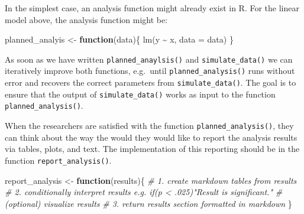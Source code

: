 \documentclass[psych,tutorial,submit,moreauthors,pdftex]{mdpi}
\newenvironment{Shaded}{\begin{snugshade}}{\end{snugshade}}
\newcommand{\AttributeTok}[1]{\textcolor[rgb]{0.77,0.63,0.00}{#1}}
\newcommand{\CommentTok}[1]{\textcolor[rgb]{0.56,0.35,0.01}{\textit{#1}}}
\newcommand{\ControlFlowTok}[1]{\textcolor[rgb]{0.13,0.29,0.53}{\textbf{#1}}}
\newcommand{\FunctionTok}[1]{\textcolor[rgb]{0.00,0.00,0.00}{#1}}
\newcommand{\NormalTok}[1]{#1}
\newcommand{\OtherTok}[1]{\textcolor[rgb]{0.56,0.35,0.01}{#1}}
\newcommand{\SpecialCharTok}[1]{\textcolor[rgb]{0.00,0.00,0.00}{#1}}
\begin{document}
In the simplest case, an analysis function might already exist in R. For
the linear model above, the analysis function might be:

\begin{Shaded}
\begin{Highlighting}[]
\NormalTok{planned\_analyis }\OtherTok{\textless{}{-}} \ControlFlowTok{function}\NormalTok{(data)\{}
    \FunctionTok{lm}\NormalTok{(y }\SpecialCharTok{\textasciitilde{}}\NormalTok{ x, }\AttributeTok{data =}\NormalTok{ data)}
\NormalTok{\}}
\end{Highlighting}
\end{Shaded}

As soon as we have written \texttt{planned\_anaylsis()} and
\texttt{simulate\_data()} we can iteratively improve both functions,
e.g.~until \texttt{planned\_analysis()} runs without error and recovers
the correct parameters from \texttt{simulate\_data()}. The goal is to
ensure that the output of \texttt{simulate\_data()} works as input to
the function \texttt{planned\_analysis()}.

When the researchers are satisfied with the function
\texttt{planned\_analysis()}, they can think about the way the would
they would like to report the analysis results via tables, plots, and
text. The implementation of this reporting should be in the function
\texttt{report\_analysis()}.

\begin{Shaded}
\begin{Highlighting}[]
\NormalTok{report\_analysis }\OtherTok{\textless{}{-}} \ControlFlowTok{function}\NormalTok{(results)\{}
  \CommentTok{\# 1. create markdown tables from results}
  \CommentTok{\# 2. conditionally interpret results e.g. if(p \textless{} .025)"Result is significant."}
  \CommentTok{\# (optional) visualize results}
  \CommentTok{\# 3. return results section formatted in markdown}
\NormalTok{\}}
\end{Highlighting}
\end{Shaded}
\end{document}
